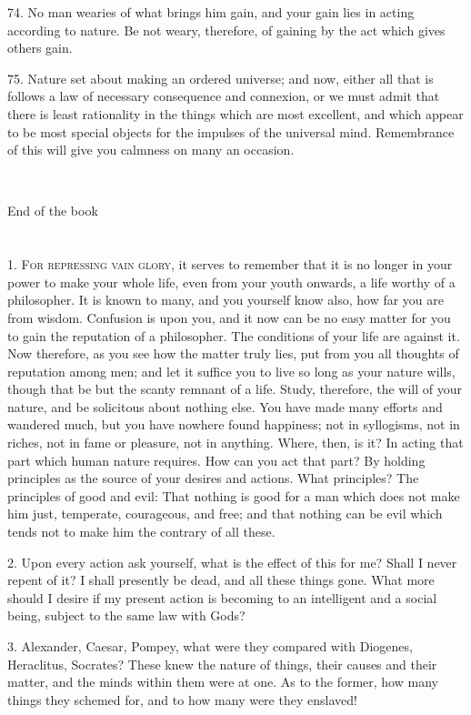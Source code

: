 \documentclass{book}
\newcommand\terminus[1]{\vspace{2em}\emph{#1} \\[2em] \begin{center}End of the \ordinalstring{chapter} book\end{center}}
\begin{document}
74. No man wearies of what brings him gain, and your gain lies in
acting according to nature. Be not weary, therefore, of gaining by the
act which gives others gain.

\newpage

75. Nature set about making an ordered universe; and now, either all
that is follows a law of necessary consequence and connexion, or we
must admit that there is least rationality in the things which are
most excellent, and which appear to be most special objects for the
impulses of the universal mind. Remembrance of this will give you
calmness on many an occasion.

\terminus{}
\chapter[For repressing vain glory,...]{}

1. \textsc{For repressing vain glory,} it serves to remember that it
is no longer in your power to make your whole life, even from your
youth onwards, a life worthy of a philosopher. It is known to many,
and you yourself know also, how far you are from wisdom. Confusion
is upon you, and it now can be no easy matter for you to gain the
reputation of a philosopher. The conditions of your life are against
it. Now therefore, as you see how the matter truly lies, put from you
all thoughts of reputation among men; and let it suffice you to live
so long as your nature wills, though that be but the scanty remnant of
a life. Study, therefore, the will of your nature, and be solicitous
about nothing else. You have made many efforts and wandered much, but
you have nowhere found happiness; not in syllogisms, not in riches, not
in fame or pleasure, not in anything. Where, then, is it? In acting
that part which human nature requires. How can you act that part? By
holding principles as the source of your desires and actions. What
principles? The principles of good and evil: That nothing is good for a
man which does not make him just, temperate, courageous, and free; and
that nothing can be evil which tends not to make him the contrary of all
these.

2. Upon every action ask yourself, what is the effect of this for me?
Shall I never repent of it? I shall presently be dead, and all these
things gone. What more should I desire if my present action is
becoming to an intelligent and a social being, subject to the same law
with Gods?

3. Alexander, Caesar, Pompey, what were they compared with Diogenes,
Heraclitus, Socrates? These knew the nature of things, their causes
and their matter, and the minds within them were at one. As to the
former, how many things they schemed for, and to how many were they
enslaved!
\end{document}
